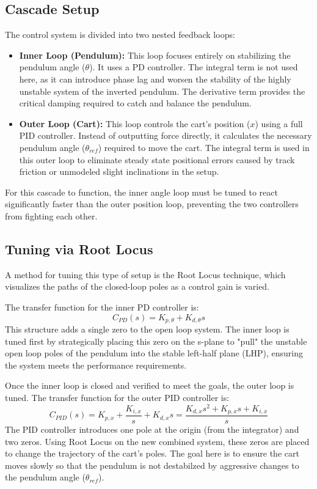 \subsection{Cascade Setup}
The control system is divided into two nested feedback loops:
\begin{itemize}
	\item \textbf{Inner Loop (Pendulum):} This loop focuses entirely on stabilizing the pendulum angle ($\theta$). It uses a PD controller. The integral term is not used here, as it can introduce phase lag and worsen the stability of the highly unstable system of the inverted pendulum. The derivative term provides the critical damping required to catch and balance the pendulum.
	\item \textbf{Outer Loop (Cart):} This loop controls the cart's position ($x$) using a full PID controller. Instead of outputting force directly, it calculates the necessary pendulum angle ($\theta_{ref}$) required to move the cart. The integral term is used in this outer loop to eliminate steady state positional errors caused by track friction or unmodeled slight inclinations in the setup.
\end{itemize}
For this cascade to function, the inner angle loop must be tuned to react significantly faster than the outer position loop, preventing the two controllers from fighting each other.

\subsection{Tuning via Root Locus}
A method for tuning this type of setup is the Root Locus technique, which visualizes the paths of the closed-loop poles as a control gain is varied.

The transfer function for the inner PD controller is:
\begin{equation}
	\label{PD controller}
	C_{PD}(s) = K_{p,\theta} + K_{d,\theta} s
\end{equation}
This structure adds a single zero to the open loop system. The inner loop is tuned first by strategically placing this zero on the s-plane to "pull" the unstable open loop poles of the pendulum into the stable left-half plane (LHP), ensuring the system meets the performance requirements.

Once the inner loop is closed and verified to meet the goals, the outer loop is tuned. The transfer function for the outer PID controller is:
\begin{equation}
	\label{PID controller}
	C_{PID}(s) = K_{p,x} + \frac{K_{i,x}}{s} + K_{d,x} s = \frac{K_{d,x} s^2 + K_{p,x} s + K_{i,x}}{s}
\end{equation}
The PID controller introduces one pole at the origin (from the integrator) and two zeros. Using Root Locus on the new combined system, these zeros are placed to change the trajectory of the cart's poles. The goal here is to ensure the cart moves slowly so that the pendulum is not destabilzed by aggressive changes to the pendulum angle ($\theta_{ref}$).

